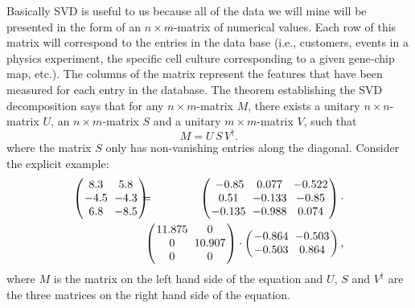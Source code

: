 \documentclass[fleqn,twoside]{article}
\newcommand{\hs}{\hskip - 2pt}
\begin{document}
Basically SVD is useful to us because all of the data we will mine
will be presented in the form of an $n \times m$-matrix of
numerical values.  Each row of this matrix will correspond to
the entries in the data base (i.e., customers, events in a physics
experiment, the specific cell culture corresponding to a given
gene-chip map, etc.).  The columns of the matrix represent the
features that have been measured for each entry in the database.
The theorem establishing the SVD decomposition says that for
any $n \times m$-matrix $M$, there exists a unitary
$n \times n$-matrix $U$, an $n \times m$-matrix $S$ and a unitary
$m \times m$-matrix $V$, such that
\begin{equation}
    M = U\,S\,V^\dag .
\end{equation}
where the matrix $S$ only has non-vanishing entries along the
diagonal.  Consider the explicit example:
{\scriptsize
\begin{eqnarray}
\left(
      \begin{array}{cc}
        \hs\hs 8.3 \hs & \hs 5.8\hs\hs \\
        \hs\hs -4.5\hs&\hs-4.3\hs\hs \\
        \hs\hs 6.8\hs&\hs-8.5\hs\hs \\
      \end{array}
    \right) \hs\hs\hs\hs&=&\hs\hs\hs\hs
    \left(
      \begin{array}{ccc}
        \hs-0.85\hs& \hs0.077\hs &\hs-0.522\hs\hs\\
        \hs\hs0.51\hs&\hs-0.133\hs&\hs-0.85\hs\hs\\
        \hs\hs-0.135\hs&\hs-0.988\hs&\hs0.074\hs\hs \\
      \end{array}
    \right)\cdot \hfill \nonumber\\
    &&\hskip -15pt \left(
      \begin{array}{cc}
        \hs\hs 11.875\hs &\hs 0\hs\hs \\
        \hs\hs 0 \hs&\hs 10.907\hs\hs \\
        \hs\hs 0 \hs&\hs 0 \hs\hs\\
      \end{array}
    \right)\cdot
    \left(
      \begin{array}{cc}
       \hs\hs -0.864 \hs&\hs -0.503\hs\hs \\
       \hs\hs -0.503 \hs&\hs 0.864 \hs\hs\\
      \end{array}
    \right),
\end{eqnarray}}
\unskip where $M$ is the matrix on the left hand side of the equation and
$U$, $S$ and $V^\dag$ are the three matrices on the right hand side
of the equation.
\end{document}
